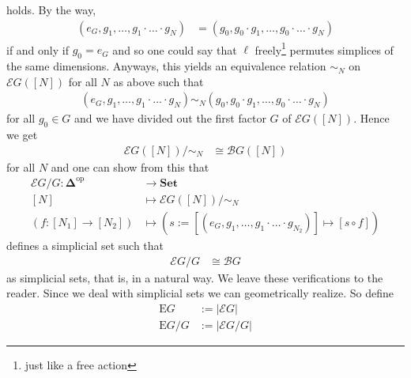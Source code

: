 holds. By the way,
\begin{align*}
  \left(
    e_{G},
    g_{1},
    \ldots,
    g_{1}
    \cdot
    \ldots
    \cdot
    g_{N}
  \right)
  &=
  \left(
    g_{0},
    g_{0}
    \cdot
    g_{1},
    \ldots,
    g_{0}
    \cdot
    \ldots
    \cdot
    g_{N}
  \right)
\end{align*}
if and only if $g_{0} = e_{G}$ and so one could say that $\ell$ freely\footnote{just like a free action} permutes simplices of the same dimensions. Anyways, this yields an equivalence relation $\sim_{N}$ on $\mathcal{E}G([N])$ for all $N$ as above such that
\begin{align*}
  \left(
    e_{G},
    g_{1},
    \ldots,
    g_{1}
    \cdot
    \ldots
    \cdot
    g_{N}
  \right)
  \sim_{N}
  \left(
    g_{0},
    g_{0}
    \cdot
    g_{1},
    \ldots,
    g_{0}
    \cdot
    \ldots
    \cdot
    g_{N}
  \right)
\end{align*}
for all $g_{0} \in G$ and we have divided out the first factor $G$ of $\mathcal{E}G([N])$. Hence we get
\begin{align*}
  \mathcal{E}G
  \left(
    [N]
  \right)
  \slash
  \sim_{N}
  &\cong
  \mathcal{B}G
  \left(
    [N]
  \right)
\end{align*}
for all $N$ and one can show from this that
\begin{align*}
  \mathcal{E}G
  \slash
  G
  \colon
  \mathbf{\Delta}^{\mathrm{op}}
  &\rightarrow
  \mathbf{Set}
  \\
  [N]
  &\mapsto
  \mathcal{E}G
  \left(
    [N]
  \right)
  \slash
  \sim_{N}
  \\
  \left(
    f
    \colon
    [N_{1}]
    \rightarrow
    [N_{2}]
  \right)
  &\mapsto
  \left(
    s
    :=
    \left[
      \left(
        e_{G},
        g_{1},
        \ldots,
        g_{1}
        \cdot
        \ldots
        \cdot
        g_{N_{2}}
      \right)
    \right]
    \mapsto
    [s \circ f]
  \right)
\end{align*}
defines a simplicial set such that
\begin{align*}
  \mathcal{E}G
  \slash
  G
  &\cong
  \mathcal{B}G
\end{align*}
as simplicial sets, that is, in a natural way. We leave these verifications to the reader. Since we deal with simplicial sets we can geometrically realize. So define
\begin{align*}
  \mathrm{E}G
  &:=
  \vert
    \mathcal{E}G
  \vert
  \\
  \mathrm{E}G
  \slash
  G
  &:=
  \vert
    \mathcal{E}G
    \slash
    G
  \vert
\end{align*}
